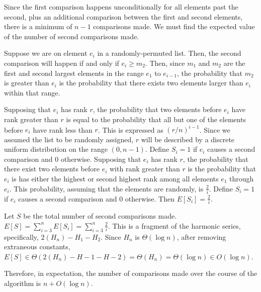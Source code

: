 \documentclass[11pt]{article}
\begin{document}
Since the first comparison happens unconditionally for all elements past the second, plus an additional comparison between the first and second elements, there is a minimum of $n-1$ comparisons made. We must find the expected value of the number of second comparisons made.

Suppose we are on element $e_i$ in a randomly-permuted list. Then, the second comparison will happen if and only if $e_i \geq m_2$. Then, since $m_1$ and $m_2$ are the first and second largest elements in the range $e_1$ to $e_{i-1}$, the probability that $m_2$ is greater than $e_i$ is the probability that there exists two elements larger than $e_i$ within that range. 

Supposing that $e_i$ has rank $r$, the probability that two elements before $e_i$ have rank greater than $r$ is equal to the probability that all but one of the elements before $e_i$ have rank less than $r$. This is expressed as $(r/n)^{i-1}$. Since we assumed the list to be randomly assigned, $r$ will be described by a discrete uniform distribution on the range $(0, n-1)$. Define $S_i = 1$ if $e_i$ causes a second comparison and $0$ otherwise. 
Supposing that $e_i$ has rank $r$, the probability that there exist two elements before $e_i$ with rank greater than $r$ is the probability that $e_i$ is has either the highest or second highest rank among all elements $e_1$ through $e_i$. This probability, assuming that the elements are randomly, is $\frac{2}{i}$. Define $S_i = 1$ if $e_i$ causes a second comparison and $0$ otherwise. Then $E[S_i] = \frac{2}{i}$.

Let $S$ be the total number of second comparisons made. $E[S] = \sum_{i=3}^{n} E[S_i] = \sum_{i=3}^{n} \frac{2}{i}$. This is a fragment of the harmonic series, specifically, $2(H_n) - H_1 - H_2$. Since $H_n$ is $\Theta(\log n)$, after removing extraneous constants, $E[S] \in \Theta(2(H_n) - H-1 - H-2) = \Theta(H_n) = \Theta(\log n) \in O(\log n)$.

Therefore, in expectation, the number of comparisons made over the course of the algorithm is $n + O(\log n)$.





\begin{align*}
\end{align*}
\end{document}
